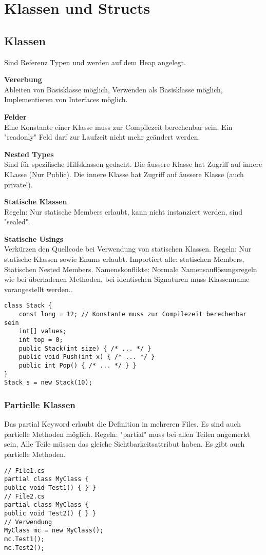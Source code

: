 
\section{Klassen und Structs}
\subsection{Klassen}
Sind Referenz Typen und werden auf dem Heap angelegt.

\textbf{Vererbung}\\ 
Ableiten von Basisklasse möglich, Verwenden als Basisklasse möglich, Implementieren von Interfaces möglich.

\textbf{Felder} \\
Eine Konstante einer Klasse muss zur Compilezeit berechenbar sein. Ein "readonly" Feld darf zur Laufzeit nicht mehr geändert werden. 

\textbf{Nested Types} \\
Sind für spezifische Hilfsklassen gedacht. Die äussere Klasse hat Zugriff auf innere KLasse (Nur Public). Die innere Klasse hat Zugriff auf äussere Klasse (auch private!).

\textbf{Statische Klassen} \\
Regeln: Nur statische Members erlaubt, kann nicht instanziert werden, sind "sealed".

\textbf{Statische Usings} \\
Verkürzen den Quellcode bei Verwendung von statischen Klassen. Regeln: Nur statische Klassen sowie Enums erlaubt. Importiert alle: statischen Members, Statischen Nested Members. Namenskonflikte: Normale Namensauflösungsregeln wie bei überladenen Methoden, bei identischen Signaturen muss Klassenname vorangestellt werden..

\begin{lstlisting}
class Stack {
	const long = 12; // Konstante muss zur Compilezeit berechenbar sein
	int[] values;
	int top = 0;
	public Stack(int size) { /* ... */ }
	public void Push(int x) { /* ... */ }
	public int Pop() { /* ... */ } }
}
Stack s = new Stack(10); 
\end{lstlisting}

\subsubsection{Partielle Klassen}
Das partial Keyword erlaubt die Definition in mehreren Files. Es sind auch partielle Methoden möglich. Regeln: "partial" muss bei allen Teilen angemerkt sein, Alle Teile müssen das gleiche Sichtbarkeitsattribut haben. Es gibt auch partielle Methoden.
\begin{lstlisting}
// File1.cs 
partial class MyClass {
public void Test1() { } } 
// File2.cs 
partial class MyClass {
public void Test2() { } }
// Verwendung 
MyClass mc = new MyClass(); 
mc.Test1(); 
mc.Test2();

\end{lstlisting}


